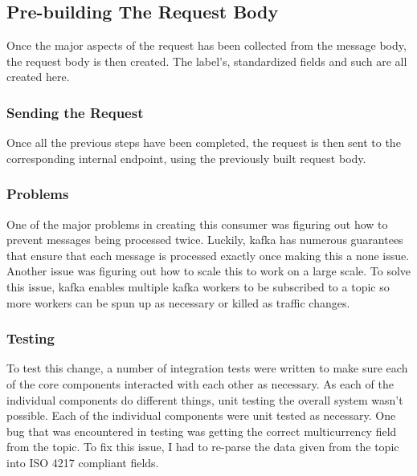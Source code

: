 \subsection{Pre-building The Request Body}
Once the major aspects of the request has been collected from the message body, the request body is then created. The label's, standardized fields and such are all created here.

\subsubsection{Sending the Request}
Once all the previous steps have been completed, the request is then sent to the corresponding internal endpoint, using the previously built request body. 

\subsubsection{Problems}
One of the major problems in creating this consumer was figuring out how to prevent messages being processed twice. Luckily, kafka has numerous guarantees that ensure that each message is processed exactly once making this a none issue. Another issue was figuring out how to scale this to work on a large scale. To solve this issue, kafka enables multiple kafka workers to be subscribed to a topic so more workers can be spun up as necessary or killed as traffic changes. 

\subsubsection{Testing}
To test this change, a number of integration tests were written to make sure each of the core components interacted with each other as necessary. As each of the individual components do different things, unit testing the overall system wasn't possible. Each of the individual components were unit tested as necessary. One bug that was encountered in testing was getting the correct multicurrency field from the topic. To fix this issue, I had to re-parse the data given from the topic into ISO 4217 compliant fields.

